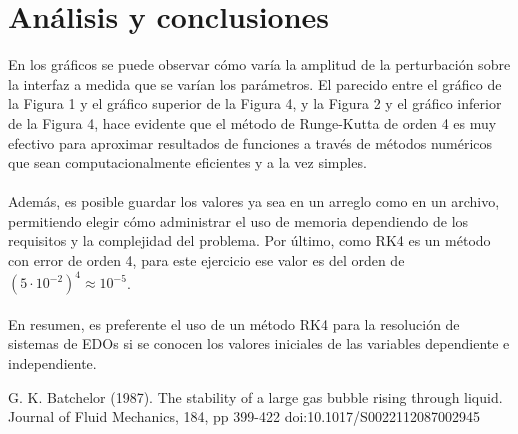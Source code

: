 \documentclass[12pt, notitlepage]{article}
\begin{document}
\section{Análisis y conclusiones}

En los gráficos se puede observar cómo varía la amplitud de la perturbación sobre la interfaz a medida que se varían los parámetros. El parecido entre el gráfico de la Figura 1 y el gráfico superior de la Figura 4, y la Figura 2 y el gráfico inferior de la Figura 4, hace evidente que el método de Runge-Kutta de orden 4 es muy efectivo para aproximar resultados de funciones a través de métodos numéricos que sean computacionalmente eficientes y a la vez simples.\\\\
Además, es posible guardar los valores ya sea en un arreglo como en un archivo, permitiendo elegir cómo administrar el uso de memoria dependiendo de los requisitos y la complejidad del problema. Por último, como RK4 es un método con error de orden 4, para este ejercicio ese valor es del orden de $(5\cdot 10^{-2})^4 \approx 10^{-5}$.\\\\
En resumen, es preferente el uso de un método RK4 para la resolución de sistemas de EDOs si se conocen los valores iniciales de las variables dependiente e independiente.

\begin{thebibliography}{1}
\item{G. K. Batchelor (1987). The stability of a large gas bubble rising through liquid. Journal of Fluid Mechanics, 184, pp 399-422 doi:10.1017/S0022112087002945}
\end{thebibliography}
\end{document}
